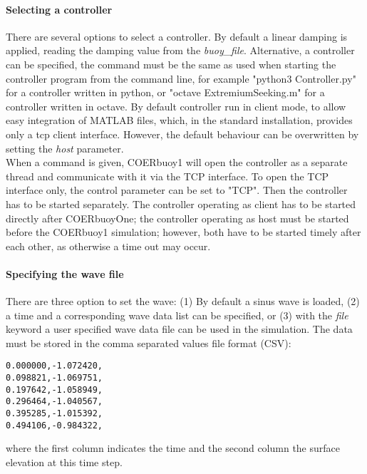 \documentclass[oneside,10pt,a4paper]{book}
\begin{document}
\paragraph{Selecting a controller}
There are several options to select a controller. By default a linear damping is applied, reading the damping value from the \textit{buoy\_file}. Alternative, a controller can be specified, the command must be the same as used when starting the controller program from the command line, for example "python3 Controller.py" for a controller written in python, or "octave ExtremiumSeeking.m" for a controller written in octave. By default controller run in client mode, to allow easy integration of MATLAB files, which, in the standard installation, provides only a tcp client interface. However, the default behaviour can be overwritten by setting the \textit{host} parameter.\\
When a command is given, COERbuoy1 will open the controller as a separate thread and communicate with it via the TCP interface. To open the TCP interface only, the control parameter can be set to "TCP". Then the controller has to be started separately. The controller operating as client has to be started directly after COERbuoyOne; the controller operating as host must be started before the COERbuoy1 simulation; however, both have to be started timely after each other, as otherwise a time out may occur.
\paragraph{Specifying the wave file}
There are three option to set the wave: (1) By default a sinus wave is loaded, (2) a time and a corresponding wave data list can be specified, or (3) with the \textit{file} keyword a user specified wave data file can be used in the simulation. The data must be stored in the comma separated values file format (CSV):
\begin{verbatim}
0.000000,-1.072420,
0.098821,-1.069751,
0.197642,-1.058949,
0.296464,-1.040567,
0.395285,-1.015392,
0.494106,-0.984322,
\end{verbatim}
where the first column indicates the time and the second column the surface elevation at this time step.
\end{document}
